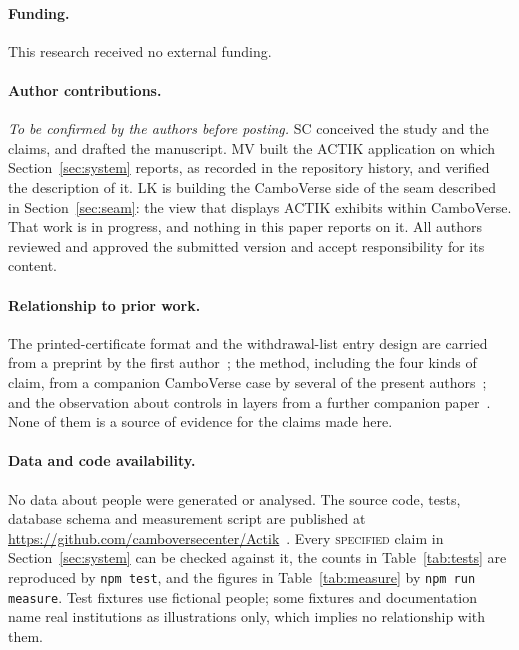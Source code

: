 \documentclass[10pt,a4paper,twocolumn]{article}
\newcommand{\code}[1]{\texttt{\small #1}}
\newcommand{\kind}[1]{\textsc{#1}}
\begin{document}
\paragraph{Funding.} This research received no external funding.

\paragraph{Author contributions.} \emph{To be confirmed by the authors before
posting.} SC conceived the study and the claims, and drafted the manuscript. MV
built the ACTIK application on which Section~\ref{sec:system} reports, as recorded
in the repository history, and verified the description of it. LK is building the
CamboVerse side of the seam described in Section~\ref{sec:seam}: the view that
displays ACTIK exhibits within CamboVerse. That work is in progress, and nothing
in this paper reports on it. All authors reviewed and approved the submitted version and accept responsibility for its
content.

\paragraph{Relationship to prior work.} The printed-certificate format and the
withdrawal-list entry design are carried from a preprint by the first
author~\citep{chay2026qrseal}; the method, including the four kinds of claim, from
a companion CamboVerse case by several of the present
authors~\citep{chay2026precinct}; and the observation about controls in layers
from a further companion paper~\citep{chay2026stages}. None of them is a source of
evidence for the claims made here.

\paragraph{Data and code availability.} No data about people were generated or
analysed. The source code, tests, database schema and measurement script are
published at \url{https://github.com/camboversecenter/Actik}~\citep{actik2026repo}. Every
\kind{specified} claim in Section~\ref{sec:system} can be checked against it, the
counts in Table~\ref{tab:tests} are reproduced by \code{npm test}, and the figures
in Table~\ref{tab:measure} by \code{npm run measure}. Test fixtures use fictional
people; some fixtures and documentation name real institutions as illustrations
only, which implies no relationship with them.
\end{document}
